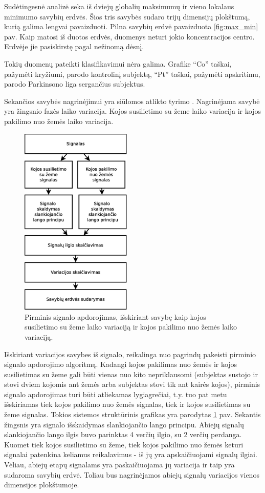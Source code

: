 \documentclass[]{vgtuef}
\begin{document}
Sudėtingesnė analizė seka iš dviejų globalių maksimumų ir vieno
lokalaus minimumo savybių erdvės. Šios tris savybės sudaro trijų
dimensijų plokštumą, kurią galima lengvai pavaizduoti. Pilna savybių
erdvė pavaizduota \ref{fig:max_min} pav. Kaip matosi iš duotos erdvės,
duomenys neturi jokio koncentracijos centro. Erdvėje jie pasiskirstę
pagal nežinomą dėsnį.

Tokių duomenų pateikti klasifikavimui nėra galima. Grafike ``Co''
taškai, pažymėti kryžiumi, parodo kontrolinį subjektą, ``Pt'' taškai,
pažymėti apskritimu, parodo Parkinsono liga sergančius subjektus.

Sekančios savybės nagrinėjimui yra siūlomos atlikto tyrimo \cite{16053531}.
Nagrinėjama savybė yra žingsnio fazės laiko variacija. Kojos
susilietimo su žeme laiko variacija ir kojos pakilimo nuo žemės laiko
variacija.

\begin{figure}[!t]
  \centering
  \includegraphics[width=200px]{figures/pirminis_signalo_apdorojimas_skaiciuojant_variacija.eps}
  \caption{Pirminis signalo apdorojimas, išskiriant savybę kaip kojos
    susilietimo su žeme laiko variaciją ir kojos pakilimo nuo žemės
    laiko variaciją.}
  \label{fig:stance_swing_extract}
\end{figure}

Išskiriant variacijos savybes iš signalo, reikalinga nuo pagrindų
pakeisti pirminio signalo apdorojimo algoritmą. Kadangi kojos
pakilimas nuo žemės ir kojos susilietimas su žeme gali būti vienas nuo
kito nepriklausomi (subjektas sustojo ir stovi dviem kojomis ant žemės
arba subjektas stovi tik ant kairės kojos), pirminis signalo
apdorojimas turi būti atliekamas lygiagrečiai, t.y. tuo pat metu
išskiriamas tiek kojos pakilimo nuo žemės signalas, tiek ir kojos
susilietimas su žeme signalas. Tokios sistemos struktūrinis grafikas
yra parodytas \ref{fig:stance_swing_extract} pav. Sekantis žingsnis yra signalo
išskaidymas slankiojančio lango principu. Abiejų signalų slankiojančio
lango ilgis buvo parinktas 4 verčių ilgio, su 2 verčių
perdanga. Kuomet tiek kojos susilietimo su žeme, tiek kojos pakilimo
nuo žemės keturi signalai patenkina keliamus reikalavimus - iš jų yra
apskaičiuojami signalų ilgiai. Vėliau, abiejų etapų signalams yra
paskaičiuojama jų variacija ir taip yra sudaroma savybių erdvė. Toliau
bus nagrinėjamos abiejų signalų variacijos vienos dimensijos
plokštumoje.
\end{document}
